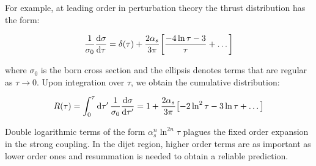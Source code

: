 \documentclass[../main.tex]{subfiles}
\begin{document}
For example, at leading order in perturbation theory the thrust distribution has the form:

\begin{equation}\label{eq:LO fixed order}
    \frac{1}{\sigma_0}\dv{\sigma}{\tau} = \delta(\tau) + \frac{2\alpha_s}{3\pi} \qty[\frac{-4 \ln \tau - 3}{\tau} + \dots]
\end{equation}

where $\sigma_0$ is the born cross section and the ellipsis denotes terms that are regular as $\tau \to 0$. 
Upon integration over $\tau$, we obtain the cumulative distribution:

\begin{equation}
    R(\tau) = \int_0^\tau \dd{\tau'} \frac{1}{\sigma_0}\dv{\sigma}{\tau'} = 1 + \frac{2\alpha_s}{3\pi} \qty[-2 \ln^2 \tau - 3 \ln \tau + \dots] 
\end{equation}

Double logarithmic terms of the form $\alpha_s^n \ln^{2n}\tau$ plagues the fixed order expansion in the strong coupling. In the dijet region, higher order 
terms are as important as lower order ones and resummation is needed to obtain a reliable prediction.
\end{document}
